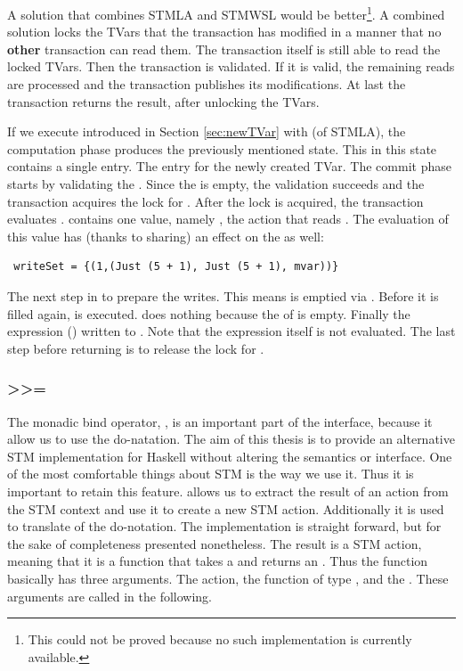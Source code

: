 A solution that combines STMLA and STMWSL would be better\footnote{This could 
not be proved because no such implementation is currently available.}.
A combined solution locks the TVars that the transaction has modified in a 
manner that no \textbf{other} transaction can read them. The transaction itself
is still able to read the locked TVars. Then the transaction is validated. 
If it is valid, the remaining reads are processed and the transaction publishes
its modifications. At last the transaction returns the result, after unlocking
the TVars.

If we execute  introduced in Section \ref{sec:newTVar} with 
 (of STMLA), the computation phase produces the previously mentioned state.
This  in this state contains a single entry. The entry for the
newly created TVar. The commit phase starts by validating the . 
Since the  is empty, the validation succeeds and the transaction
acquires the lock for . After the lock is acquired, the transaction 
evaluates .  contains one value, namely ,
the  action that reads . The evaluation of this value 
has (thanks to sharing) an effect on the  as well:
\begin{lstlisting}
 writeSet = {(1,(Just (5 + 1), Just (5 + 1), mvar))} 
\end{lstlisting}
The next step in to prepare the writes. This means  is emptied via 
. Before it is filled again,  is executed. 
does nothing because the  of  is empty. Finally the expression ()
written to . Note that the expression itself is not evaluated. The last step
before returning \code{()} is to release the lock for .

\subsubsection{>>=}
The monadic bind operator, \code{>>=}, is an important part of the interface, because it allow us 
to use the do-natation. The aim of this thesis is to provide an alternative STM 
implementation for Haskell without altering the semantics or interface. One of 
the most comfortable things about STM is the way we use it. Thus it is important to 
retain this feature.  allows us to 
extract the result of an  action from the STM context and use it to create 
a new STM action. Additionally it is used to translate \code{<-} of the do-notation.
The implementation is straight forward, but for the sake of completeness presented
nonetheless. The result is a STM action, meaning that it is a function that takes 
a  and returns an . Thus the function basically
has three arguments. The  action, the function of type ,
and the . These arguments are called 
in the following. 


